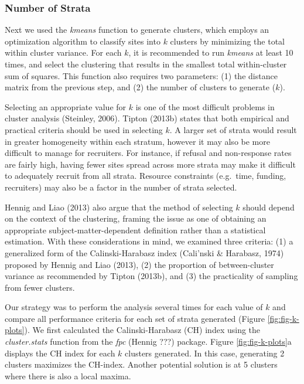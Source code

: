 \documentclass[man,floatsintext]{apa6}
\begin{document}
\hypertarget{number-of-strata}{%
\subsubsection{Number of Strata}\label{number-of-strata}}

Next we used the \emph{kmeans} function to generate clusters, which employs an optimization algorithm to classify sites into \(k\) clusters by minimizing the total within cluster variance. For each \(k\), it is recommended to run \emph{kmeans} at least 10 times, and select the clustering that results in the smallest total within-cluster sum of squares. This function also requires two parameters: (1) the distance matrix from the previous step, and (2) the number of clusters to generate (\(k\)).

Selecting an appropriate value for \(k\) is one of the most difficult problems in cluster analysis (Steinley, 2006). Tipton (2013b) states that both empirical and practical criteria should be used in selecting \(k\). A larger set of strata would result in greater homogeneity within each stratum, however it may also be more difficult to manage for recruiters. For instance, if refusal and non-response rates are fairly high, having fewer sites spread across more strata may make it difficult to adequately recruit from all strata. Resource constraints (e.g.~time, funding, recruiters) may also be a factor in the number of strata selected.

Hennig and Liao (2013) also argue that the method of selecting \(k\) should depend on the context of the clustering, framing the issue as one of obtaining an appropriate subject-matter-dependent definition rather than a statistical estimation. With these considerations in mind, we examined three criteria: (1) a generalized form of the Calinski-Harabasz index (Cali\a'nski \& Harabasz, 1974) proposed by Hennig and Liao (2013), (2) the proportion of between-cluster variance as recommended by Tipton (2013b), and (3) the practicality of sampling from fewer clusters.

Our strategy was to perform the analysis several times for each value of \(k\) and compare all performance criteria for each set of strata generated (Figure \ref{fig:fig-k-plots}). We first calculated the Calinski-Harabasz (CH) index using the \emph{cluster.stats} function from the \emph{fpc} (Hennig ???) package. Figure \ref{fig:fig-k-plots}a displays the CH index for each \(k\) clusters generated. In this case, generating 2 clusters maximizes the CH-index. Another potential solution is at 5 clusters where there is also a local maxima.
\end{document}
